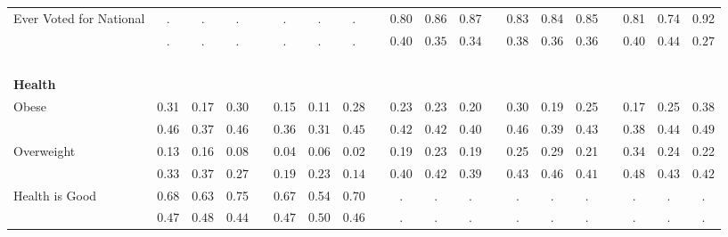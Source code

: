 \begin{center}
{\begin{longtable}{L{5cm} c c c p{.5cm} c c c p{.5cm} c c c p{.5cm} c c c p{.5cm} c c c}
 \quad Ever Voted for National & . &         . &         . & &         . &         . &         . & &      0.80 &      0.86 &      0.87 & &      0.83 &      0.84 &      0.85 & &      0.81 &      0.74 &      0.92 \\*
 \quad & $\mathit{        .}$ & $\mathit{        .}$ & $\mathit{        .}$ & & $\mathit{        .}$ & $\mathit{        .}$ & $\mathit{        .}$ & & $\mathit{     0.40}$ & $\mathit{     0.35}$ & $\mathit{     0.34}$ & & $\mathit{     0.38}$ & $\mathit{     0.36}$ & $\mathit{     0.36}$ & & $\mathit{     0.40}$ & $\mathit{     0.44}$ & $\mathit{     0.27}$ \\[.2em]
 ~\\[-.5em]
\textbf{Health} \\[.6em]
 \quad Obese & 0.31 &      0.17 &      0.30 & &      0.15 &      0.11 &      0.28 & &      0.23 &      0.23 &      0.20 & &      0.30 &      0.19 &      0.25 & &      0.17 &      0.25 &      0.38 \\*
 \quad & $\mathit{     0.46}$ & $\mathit{     0.37}$ & $\mathit{     0.46}$ & & $\mathit{     0.36}$ & $\mathit{     0.31}$ & $\mathit{     0.45}$ & & $\mathit{     0.42}$ & $\mathit{     0.42}$ & $\mathit{     0.40}$ & & $\mathit{     0.46}$ & $\mathit{     0.39}$ & $\mathit{     0.43}$ & & $\mathit{     0.38}$ & $\mathit{     0.44}$ & $\mathit{     0.49}$ \\[.2em]
 \quad Overweight & 0.13 &      0.16 &      0.08 & &      0.04 &      0.06 &      0.02 & &      0.19 &      0.23 &      0.19 & &      0.25 &      0.29 &      0.21 & &      0.34 &      0.24 &      0.22 \\*
 \quad & $\mathit{     0.33}$ & $\mathit{     0.37}$ & $\mathit{     0.27}$ & & $\mathit{     0.19}$ & $\mathit{     0.23}$ & $\mathit{     0.14}$ & & $\mathit{     0.40}$ & $\mathit{     0.42}$ & $\mathit{     0.39}$ & & $\mathit{     0.43}$ & $\mathit{     0.46}$ & $\mathit{     0.41}$ & & $\mathit{     0.48}$ & $\mathit{     0.43}$ & $\mathit{     0.42}$ \\[.2em]
 \quad Health is Good & 0.68 &      0.63 &      0.75 & &      0.67 &      0.54 &      0.70 & &         . &         . &         . & &         . &         . &         . & &         . &         . &         . \\*
 \quad & $\mathit{     0.47}$ & $\mathit{     0.48}$ & $\mathit{     0.44}$ & & $\mathit{     0.47}$ & $\mathit{     0.50}$ & $\mathit{     0.46}$ & & $\mathit{        .}$ & $\mathit{        .}$ & $\mathit{        .}$ & & $\mathit{        .}$ & $\mathit{        .}$ & $\mathit{        .}$ & & $\mathit{        .}$ & $\mathit{        .}$ & $\mathit{        .}$ \\[.2em]

\end{longtable}}
\end{center}
